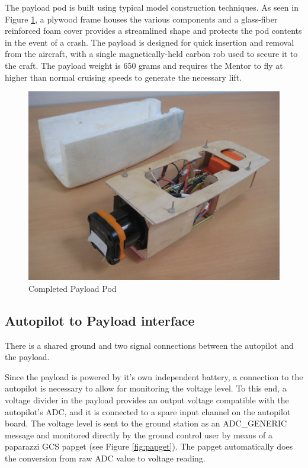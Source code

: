\documentclass[a4paper,11pt]{report}
\begin{document}
The payload pod is built using typical model construction techniques. As seen in Figure \ref{fig:payload}, a plywood frame houses the various components and a glass-fiber reinforced foam cover provides a streamlined shape and protects the pod contents in the event of a crash. The payload is designed for quick insertion and removal from the aircraft, with a single magnetically-held carbon rob used to secure it to the craft. The payload weight is 650 grams and requires the Mentor to fly at higher than normal cruising speeds to generate the necessary lift. 

\begin{figure}[ht]
 \centering
 \includegraphics[width=12cm]{Mentor1_payload2.jpg}
 \caption{Completed Payload Pod}
 \label{fig:payload}
\end{figure}

\subsection{Autopilot to Payload interface}

There is a shared ground and two signal connections between the autopilot and the payload.

Since the payload is powered by it's own independent battery, a connection to the autopilot is necessary to allow for monitoring the voltage level. To this end, a voltage divider in the payload provides an output voltage compatible with the autopilot's ADC, and it is connected to a spare input channel on the autopilot board. The voltage level is sent to the ground station as an ADC\_GENERIC message and monitored directly by the ground control user by means of a paparazzi GCS papget (see Figure \ref{fig:papget}). The papget automatically does the conversion from raw ADC value to voltage reading.
\end{document}
